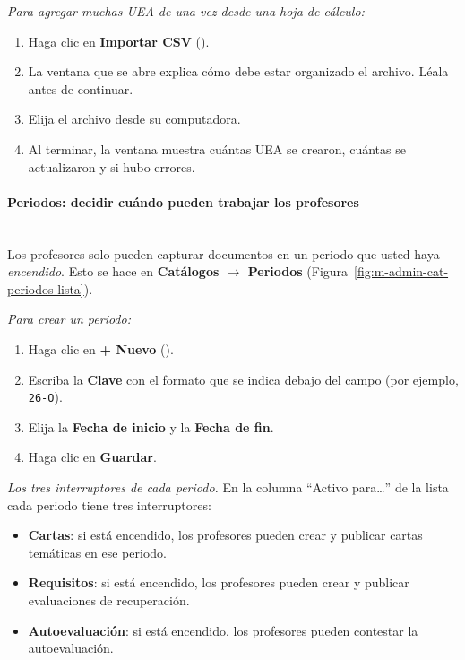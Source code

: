 
\textit{Para agregar muchas UEA de una vez desde una hoja de cálculo:}
\begin{enumerate}
    \item Haga clic en \textbf{Importar CSV} ().
    \item La ventana que se abre explica cómo debe estar organizado el archivo. Léala antes de continuar.
    \item Elija el archivo desde su computadora.
    \item Al terminar, la ventana muestra cuántas UEA se crearon, cuántas se actualizaron y si hubo errores.
\end{enumerate}

\paragraph{Periodos: decidir cuándo pueden trabajar los profesores}\label{apx:manual-user:admin-periodos}\mbox{}\\
Los profesores solo pueden capturar documentos en un periodo que usted haya \emph{encendido}. Esto se hace en \textbf{Catálogos $\to$ Periodos} (Figura~\ref{fig:m-admin-cat-periodos-lista}).


\textit{Para crear un periodo:}
\begin{enumerate}
    \item Haga clic en \textbf{+ Nuevo} ().
    \item Escriba la \textbf{Clave} con el formato que se indica debajo del campo (por ejemplo, \texttt{26-O}).
    \item Elija la \textbf{Fecha de inicio} y la \textbf{Fecha de fin}.
    \item Haga clic en \textbf{Guardar}.
\end{enumerate}

\textit{Los tres interruptores de cada periodo.} En la columna ``Activo para\ldots'' de la lista cada periodo tiene tres interruptores:

\begin{itemize}
    \item \textbf{Cartas}: si está encendido, los profesores pueden crear y publicar cartas temáticas en ese periodo.
    \item \textbf{Requisitos}: si está encendido, los profesores pueden crear y publicar evaluaciones de recuperación.
    \item \textbf{Autoevaluación}: si está encendido, los profesores pueden contestar la autoevaluación.
\end{itemize}

